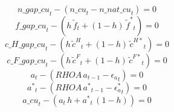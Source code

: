 \begin{dmath}
{n\_gap\_cu}_{t}-\left({n\_cu}_{t}-{n\_nat\_cu}_{t}\right)=0
\end{dmath}
\begin{dmath}
{f\_gap\_cu}_{t}-\left({{h}}\, {{\tilde f}}_{t}+\left(1-{{h}}\right)\, {{\tilde f^*}}_{t}\right)=0
\end{dmath}
\begin{dmath}
{c\_H\_gap\_cu}_{t}-\left({{h}}\, {{\tilde c^H}}_{t}+\left(1-{{h}}\right)\, {{\tilde c^{H*}}}_{t}\right)=0
\end{dmath}
\begin{dmath}
{c\_F\_gap\_cu}_{t}-\left({{h}}\, {{\tilde c^F}}_{t}+\left(1-{{h}}\right)\, {{\tilde c^{F*}}}_{t}\right)=0
\end{dmath}
\begin{dmath}
{{a}}_{t}-\left({RHOA}\, {{a}}_{t-1}-{{\epsilon_a}}_{t}\right)=0
\end{dmath}
\begin{dmath}
{{a^*}}_{t}-\left({RHOA}\, {{a^*}}_{t-1}-{{\epsilon_a^*}}_{t}\right)=0
\end{dmath}
\begin{dmath}
{a\_cu}_{t}-\left({{a}}_{t}\, {{h}}+{{a^*}}_{t}\, \left(1-{{h}}\right)\right)=0
\end{dmath}

